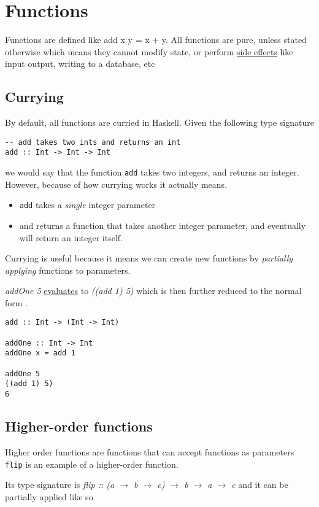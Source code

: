 \section{Functions}
Functions are defined like add x y = x + y. All functions are pure, unless stated otherwise which means
they cannot modify state, or perform \underline{side effects} like input output, writing to a database, etc

\subsection{Currying}
By default, all functions are curried in Haskell. Given the following type signature

\begin{lstlisting}
-- add takes two ints and returns an int
add :: Int -> Int -> Int
\end{lstlisting}

we would say that the function \texttt{add} takes two integers, and returns an integer.
However, because of how currying works it actually means.

\begin{itemize}
    \item \texttt{add} takes a \emph{single} integer parameter
    \item and returns a function that takes another integer parameter, and eventually
    will return an integer itself.
\end{itemize}

Currying is useful because it means we can create new functions by \emph{partially applying}
functions to parameters.

\emph{addOne 5} \underline{evaluates} to \emph{((add 1) 5)} which is then further reduced to
the normal form .

\begin{lstlisting}
add :: Int -> (Int -> Int)

addOne :: Int -> Int
addOne x = add 1

addOne 5
((add 1) 5)
6
\end{lstlisting}

\subsection{Higher-order functions}
Higher order functions are functions that can accept functions as parameters
\texttt{flip} is an example of a higher-order function.

Its type signature is \emph{flip :: (a $\rightarrow$ b $\rightarrow$ c) $\rightarrow$ b $\rightarrow$ a $\rightarrow$ c}
and it can be partially applied like so

